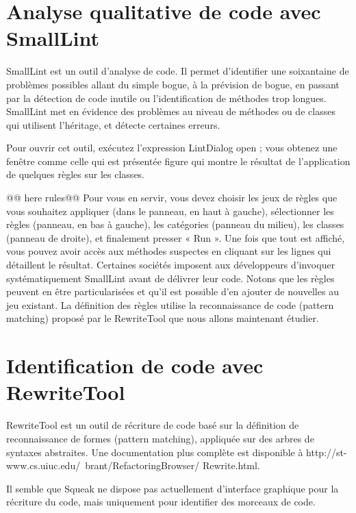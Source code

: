 \documentclass[a4paper,10pt,twoside]{book}
\begin{document}
\section{ Analyse qualitative de code avec SmallLint}

 SmallLint est un outil d'analyse de code. Il permet d'identifier une soixantaine de
probl\`emes possibles allant du simple bogue, à la pr\'evision de bogue,
en passant par la d\'etection de code inutile ou l'identification de
m\'ethodes trop longues. SmallLint met en \'evidence des probl\`emes au
niveau de m\'ethodes ou de classes qui utilisent l'h\'eritage, et d\'etecte
certaines erreurs.  

Pour ouvrir cet outil, ex\'ecutez l'expression
LintDialog open ; vous obtenez une fenêtre comme celle qui est
pr\'esent\'ee figure  qui montre le r\'esultat de l'application de
quelques r\`egles sur les classes.


@@ here rules@@
 Pour vous en servir,
vous devez choisir les jeux de r\`egles que vous souhaitez appliquer
(dans le panneau, en haut à gauche), s\'electionner les r\`egles (panneau,
en bas à gauche), les cat\'egories (panneau du milieu), les classes
(panneau de droite), et finalement presser « Run ». Une fois que tout
est affich\'e, vous pouvez avoir acc\`es aux m\'ethodes suspectes en
cliquant sur les lignes qui d\'etaillent le r\'esultat.  Certaines
soci\'et\'es imposent aux d\'eveloppeurs d'invoquer syst\'ematiquement
SmallLint avant de d\'elivrer leur code. Notons que les r\`egles peuvent
en être particularis\'ees et qu'il est possible d'en ajouter de
nouvelles au jeu existant. La d\'efinition des r\`egles utilise la
reconnaissance de code (pattern matching) propos\'e par le RewriteTool
que nous allons maintenant \'etudier.

\section{Identification de code avec RewriteTool}

RewriteTool est un outil de r\'ecriture de code bas\'e sur la d\'efinition
de reconnaissance de formes (pattern matching), appliqu\'ee sur des
arbres de syntaxes abstraites. Une documentation plus compl\`ete est
disponible à http://st-www.cs.uiuc.edu/~brant/RefactoringBrowser/
Rewrite.html.

Il semble que Squeak ne dispose pas actuellement d'interface graphique
pour la r\'ecriture du code, mais uniquement pour identifier des
morceaux de code.
\end{document}
